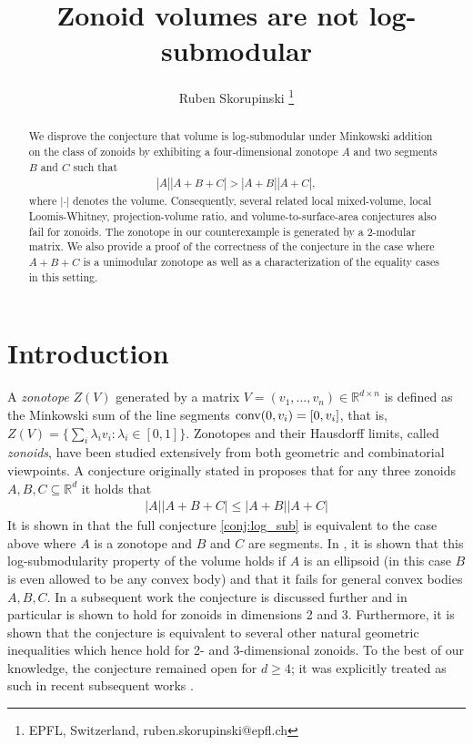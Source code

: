 \documentclass{article}
\title{Zonoid volumes are not log-submodular}
\author{
Ruben Skorupinski \thanks{EPFL, Switzerland, \textsf{ruben.skorupinski@epfl.ch}}
}
\date{}
\newcommand{\conv}{\textup{conv}}
\newcommand{\R}{\mathbb{R}}
\theoremstyle{theorem}
\theoremstyle{remark}
\begin{document}
\maketitle


\begin{abstract}   
    We disprove the conjecture that volume is log-submodular under Minkowski addition on the class of zonoids by exhibiting a four-dimensional zonotope $A$ and two segments $B$ and $C$ such that
    \begin{align*}
        |A||A+B+C|>|A+B||A+C|,
    \end{align*}
    where $|\cdot|$ denotes the volume. Consequently, several related local mixed-volume, local Loomis-Whitney, projection-volume ratio, and volume-to-surface-area conjectures also fail for zonoids. The zonotope in our counterexample is generated by a 2-modular matrix. We also provide a proof of the correctness of the conjecture in the case where $A+B+C$ is a unimodular zonotope as well as a characterization of the equality cases in this setting.
\end{abstract}

\section{Introduction}

A \emph{zonotope} $Z(V)$ generated by a matrix $V=(v_1,...,v_n) \in \R^{d \times n}$ is defined as the Minkowski sum of the line segments $\conv(0,v_i)= [0,v_i]$, that is, $Z(V) = \{\sum_i\lambda_i v_i: \lambda_i \in [0,1]\}$. Zonotopes and their Hausdorff limits, called \emph{zonoids}, have been studied extensively from both geometric and combinatorial viewpoints. A conjecture originally stated in \citet[Conjecture 4.16]{fradelizi2024sumset} proposes that for any three zonoids $A,B,C \subseteq \R^d$ it holds that 
\begin{align}\label{conj:log_sub}
    |A||A+B+C| \leq |A+B||A+C| 
\end{align}
It is shown in \cite{fradelizi2024volume} that the full conjecture \cref{conj:log_sub} is equivalent to the case above where $A$ is a zonotope and $B$ and $C$ are segments. In \cite{fradelizi2024sumset}, it is shown that this log-submodularity property of the volume holds if $A$ is an ellipsoid (in this case $B$ is even allowed to be any convex body) and that it fails for general convex bodies $A,B,C$. In a subsequent work \citep{fradelizi2024volume} the conjecture is discussed further and in particular is shown to hold for zonoids in dimensions 2 and 3. Furthermore, it is shown that the conjecture is equivalent to several other natural geometric inequalities which hence hold for 2- and 3-dimensional zonoids. To the best of our knowledge, the conjecture remained open for $d \geq 4$; it was explicitly treated as such in recent subsequent works \citep{fradelizi2026weighted, manui2025volume}.
\end{document}

